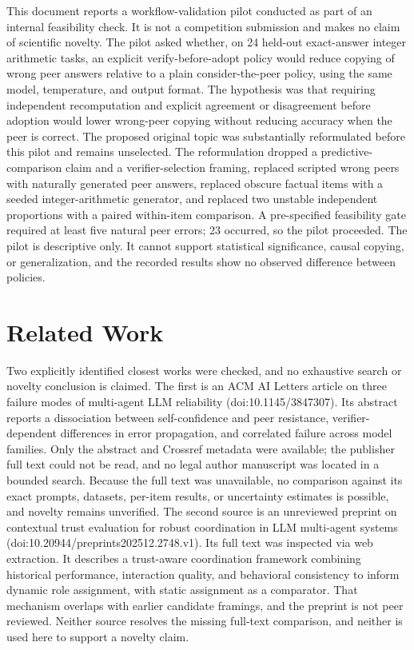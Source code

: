 \documentclass{article}
\begin{document}
This document reports a workflow-validation pilot conducted as part of an internal feasibility check. It is not a competition submission and makes no claim of scientific novelty. The pilot asked whether, on 24 held-out exact-answer integer arithmetic tasks, an explicit verify-before-adopt policy would reduce copying of wrong peer answers relative to a plain consider-the-peer policy, using the same model, temperature, and output format. The hypothesis was that requiring independent recomputation and explicit agreement or disagreement before adoption would lower wrong-peer copying without reducing accuracy when the peer is correct. The proposed original topic was substantially reformulated before this pilot and remains unselected. The reformulation dropped a predictive-comparison claim and a verifier-selection framing, replaced scripted wrong peers with naturally generated peer answers, replaced obscure factual items with a seeded integer-arithmetic generator, and replaced two unstable independent proportions with a paired within-item comparison. A pre-specified feasibility gate required at least five natural peer errors; 23 occurred, so the pilot proceeded. The pilot is descriptive only. It cannot support statistical significance, causal copying, or generalization, and the recorded results show no observed difference between policies.

\section{Related Work}

Two explicitly identified closest works were checked, and no exhaustive search or novelty conclusion is claimed. The first is an ACM AI Letters article on three failure modes of multi-agent LLM reliability (doi:10.1145/3847307). Its abstract reports a dissociation between self-confidence and peer resistance, verifier-dependent differences in error propagation, and correlated failure across model families. Only the abstract and Crossref metadata were available; the publisher full text could not be read, and no legal author manuscript was located in a bounded search. Because the full text was unavailable, no comparison against its exact prompts, datasets, per-item results, or uncertainty estimates is possible, and novelty remains unverified. The second source is an unreviewed preprint on contextual trust evaluation for robust coordination in LLM multi-agent systems (doi:10.20944/preprints202512.2748.v1). Its full text was inspected via web extraction. It describes a trust-aware coordination framework combining historical performance, interaction quality, and behavioral consistency to inform dynamic role assignment, with static assignment as a comparator. That mechanism overlaps with earlier candidate framings, and the preprint is not peer reviewed. Neither source resolves the missing full-text comparison, and neither is used here to support a novelty claim.
\end{document}
